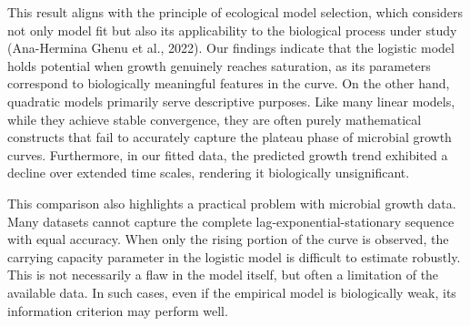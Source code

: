 \documentclass{article}
\begin{document}
This result aligns with the principle of ecological model selection, which considers not only model fit but also its applicability to the biological process under study (Ana-Hermina Ghenu et al., 2022). Our findings indicate that the logistic model holds potential when growth genuinely reaches saturation, as its parameters correspond to biologically meaningful features in the curve. On the other hand, quadratic models primarily serve descriptive purposes. Like many linear models, while they achieve stable convergence, they are often purely mathematical constructs that fail to accurately capture the plateau phase of microbial growth curves. Furthermore, in our fitted data, the predicted growth trend exhibited a decline over extended time scales, rendering it biologically unsignificant.

This comparison also highlights a practical problem with microbial growth data. Many datasets cannot capture the complete lag-exponential-stationary sequence with equal accuracy. When only the rising portion of the curve is observed, the carrying capacity parameter in the logistic model is difficult to estimate robustly. This is not necessarily a flaw in the model itself, but often a limitation of the available data. In such cases, even if the empirical model is biologically weak, its information criterion may perform well.
\end{document}
